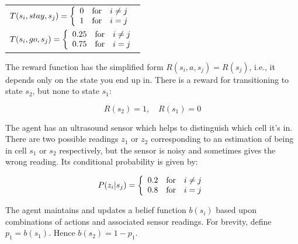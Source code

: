 \documentclass[12pt]{article}
\begin{document}
\begin{center}
\begin{tabular}{l}
$T(s_i,stay,s_j) = \left\{ \begin{array}{lll}
                                   0 & \hbox{for} & i\neq j \\
                                   1 & \hbox{for} & i = j
                            \end{array}
                    \right.$ \\[.2in]
$T(s_i,go,s_j) = \left\{ \begin{array}{lll}
                                   0.25 & \hbox{for} & i\neq j \\
                                   0.75 & \hbox{for} & i = j
                            \end{array}
                    \right.$
\end{tabular}
\end{center}

\noindent
The reward function has the simplified form $R(s_i,a,s_j) = R(s_j)$,
i.e., it depends only on the state you end up in.  There is a reward
for transitioning to state $s_2$, but none to state $s_1$:

$$R(s_2) = 1, \quad R(s_1) = 0$$

\noindent
The agent has an ultrasound sensor which helps to distinguish which
cell it's in.  There are two possible readings $z_1$ or $z_2$
corresponding to an estimation of being in cell $s_1$ or $s_2$
respectively, but the sensor is noisy and sometimes gives the wrong
reading.  Its conditional probability is given by:

$$P(z_i | s_j) = \left\{ \begin{array}{lll}
                                   0.2 & \hbox{for} & i\neq j \\
                                   0.8 & \hbox{for} & i = j
                            \end{array}
                    \right.$$

\noindent
The agent maintains and updates a belief function $b(s_i)$ based upon
combinations of actions and associated sensor readings.  For brevity,
define $p_1 = b(s_1)$.  Hence $b(s_2) = 1 - p_1$.
\end{document}
